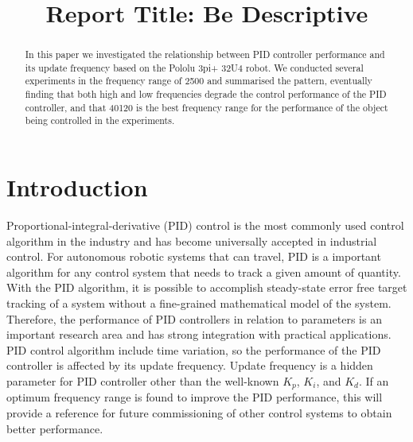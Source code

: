 \documentclass[conference]{IEEEtran}
\begin{document}
\title{Report Title: Be Descriptive}

\author{
    \and
}

\maketitle

\begin{abstract}
In this paper we investigated the relationship between PID controller performance and its update frequency based on the Pololu 3pi+ 32U4 robot. We conducted several experiments in the frequency range of 2\bm{$\sim$}500 and summarised the pattern, eventually finding that both high and low frequencies degrade the control performance of the PID controller, and that 40\bm{$\sim$}120 is the best frequency range for the performance of the object being controlled in the experiments.
\end{abstract}


\section{Introduction}
\label{Introduction}
Proportional-integral-derivative (PID) control is the most commonly used control algorithm in the industry and has become universally accepted in industrial control\cite{knospe2006pid}. For autonomous robotic systems that can travel, 
PID is a important algorithm for any control system that needs to track a given amount of quantity. With the PID algorithm, it is possible to accomplish steady-state error free target tracking of a system without a fine-grained mathematical model of the system. Therefore, the performance of PID controllers in relation to parameters is an important research area and has strong integration with practical applications.
PID control algorithm include time variation, so the performance of the PID controller is affected by its update frequency. Update frequency is a hidden parameter for PID controller other than the well-known $K_{p}$, $K_{i}$, and $K_{d}$. 
 If an optimum frequency range is found to improve the PID performance, this will provide a reference for future commissioning of other control systems to obtain better performance.
\end{document}
